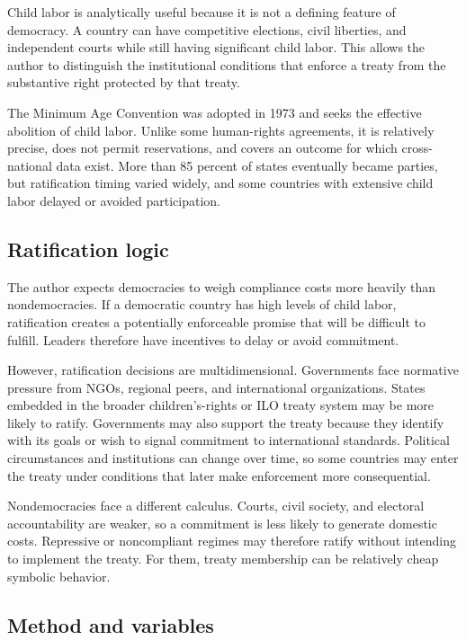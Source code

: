Child labor is analytically useful because it is not a defining feature of democracy. A country can have competitive elections, civil liberties, and independent courts while still having significant child labor. This allows the author to distinguish the institutional conditions that enforce a treaty from the substantive right protected by that treaty.

The Minimum Age Convention was adopted in 1973 and seeks the effective abolition of child labor. Unlike some human-rights agreements, it is relatively precise, does not permit reservations, and covers an outcome for which cross-national data exist. More than 85 percent of states eventually became parties, but ratification timing varied widely, and some countries with extensive child labor delayed or avoided participation.

\subsection{Ratification logic}

The author expects democracies to weigh compliance costs more heavily than nondemocracies. If a democratic country has high levels of child labor, ratification creates a potentially enforceable promise that will be difficult to fulfill. Leaders therefore have incentives to delay or avoid commitment.

However, ratification decisions are multidimensional. Governments face normative pressure from NGOs, regional peers, and international organizations. States embedded in the broader children's-rights or ILO treaty system may be more likely to ratify. Governments may also support the treaty because they identify with its goals or wish to signal commitment to international standards. Political circumstances and institutions can change over time, so some countries may enter the treaty under conditions that later make enforcement more consequential.

Nondemocracies face a different calculus. Courts, civil society, and electoral accountability are weaker, so a commitment is less likely to generate domestic costs. Repressive or noncompliant regimes may therefore ratify without intending to implement the treaty. For them, treaty membership can be relatively cheap symbolic behavior.

\subsection{Method and variables}

